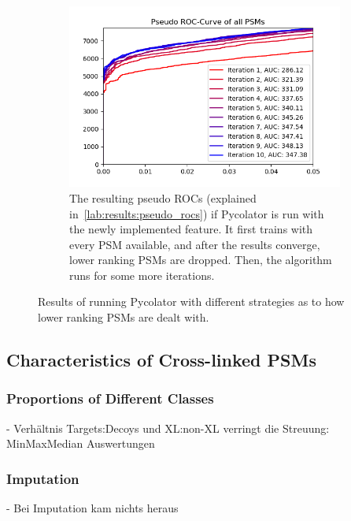 \begin{figure}
\begin{subfigure}{0.49\textwidth}
		\label{fig:only_rank_one}
	\end{subfigure}
	\begin{subfigure}{0.75\textwidth}
		\includegraphics[width = \textwidth]{figures/optimalRanking.png}
		\caption[Result of the new ranking procedure]{The resulting pseudo ROCs (explained in~\ref{lab:results:pseudo_rocs}) if Pycolator is run with the newly implemented feature. It first trains with every PSM available, and after the results converge, lower ranking PSMs are dropped. Then, the algorithm runs for some more iterations.}
		\label{fig:optimalranking}
	\end{subfigure}
	\caption[Results of strategies regarding different ranks]{Results of running Pycolator with different strategies as to how lower ranking PSMs are dealt with.}
	\label{fig:before_optimalranking}
\end{figure}
\renewcommand{\baselinestretch}{1}

\subsection{Characteristics of Cross-linked PSMs}
\subsubsection{Proportions of Different Classes}
\label{lab:results:proportions}
- Verhältnis Targets:Decoys und XL:non-XL verringt die Streuung: MinMaxMedian Auswertungen\\
\subsubsection{Imputation}
\label{lab:results:imputation}
- Bei Imputation kam nichts heraus\\
